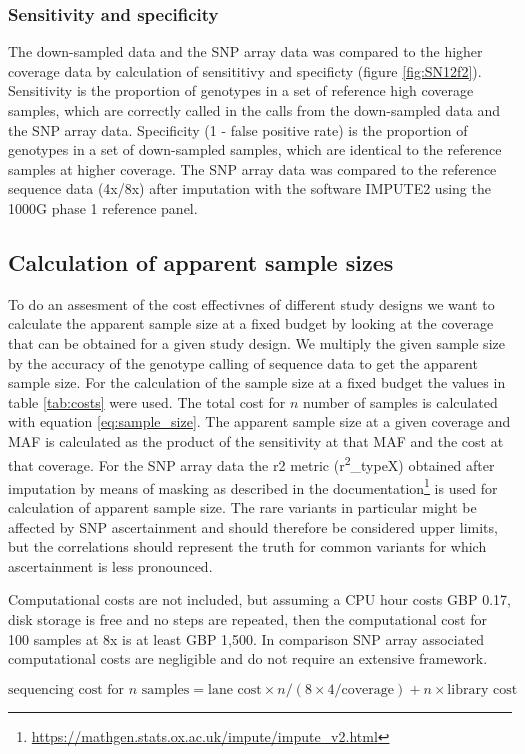 \subsubsection{Sensitivity and specificity}
\label{subsec:sensspec}
The down-sampled data and the SNP array data was compared to the higher coverage data by calculation of sensititivy and specificty (figure \ref{fig:SN12f2}). Sensitivity is the proportion of genotypes in a set of reference high coverage samples, which are correctly called in the calls from the down-sampled data and the SNP array data. Specificity (1 - false positive rate) is the proportion of genotypes in a set of down-sampled samples, which are identical to the reference samples at higher coverage.
The \gls{SNP} array data was compared to the reference sequence data (4x/8x) after imputation with the software IMPUTE2 using the \gls{1000G} phase 1 reference panel.





\subsection{Calculation of apparent sample sizes}
\label{subsec:samplesize}
To do an assesment of the cost effectivnes of different study designs we want to calculate the apparent sample size at a fixed budget by looking at the coverage that can be obtained for a given study design. We multiply the given sample size by the accuracy of the genotype calling of sequence data to get the apparent sample size. For the calculation of the sample size at a fixed budget the values in table \ref{tab:costs} were used. The total cost  for $n$ number of samples is calculated with equation \ref{eq:sample_size}. The apparent sample size at a given coverage and \gls{MAF} is calculated as the product of the sensitivity at that \gls{MAF} and the cost at that coverage. For the SNP array data the \gls{r2} metric (r\textsuperscript{2}\_typeX) obtained after imputation by means of masking as described in the documentation\footnote{\url{https://mathgen.stats.ox.ac.uk/impute/impute_v2.html}} is used for calculation of apparent sample size. The rare variants in particular might be affected by SNP ascertainment and should therefore be considered upper limits, but the correlations should represent the truth for common variants for which ascertainment is less pronounced.

Computational costs are not included, but assuming a \gls{CPU} hour costs \gls{GBP} 0.17, disk storage is free and no steps are repeated, then the computational cost for 100 samples at 8x is at least \gls{GBP} 1,500. In comparison \gls{SNP} array associated computational costs are negligible and do not require an extensive framework.


\begin{equation}[htbp]
\text{sequencing cost for } n \text{ samples} = \text{lane cost} \times n/(8 \times 4 / \text{coverage}) + n \times \text{library cost}
\label{eq:sample_size}
\end{equation}